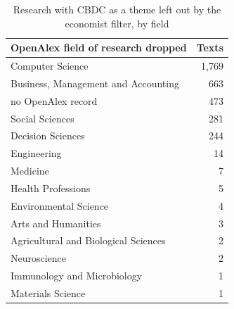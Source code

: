 \begin{table}[htbp]
\centering\small
\caption{Research with CBDC as a theme left out by the economist filter, by field}\label{tab:dropped}
\begin{tabular}{@{}lr@{}}
\toprule
\textbf{OpenAlex field of research dropped} & \textbf{Texts} \\
\midrule
Computer Science & 1,769 \\
Business, Management and Accounting & 663 \\
no OpenAlex record & 473 \\
Social Sciences & 281 \\
Decision Sciences & 244 \\
Engineering & 14 \\
Medicine & 7 \\
Health Professions & 5 \\
Environmental Science & 4 \\
Arts and Humanities & 3 \\
Agricultural and Biological Sciences & 2 \\
Neuroscience & 2 \\
Immunology and Microbiology & 1 \\
Materials Science & 1 \\
\bottomrule
\end{tabular}
\end{table}
